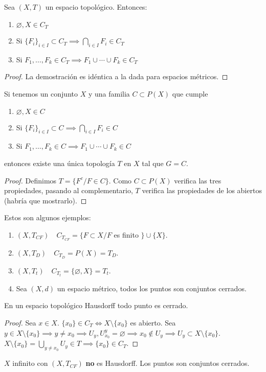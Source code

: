 \begin{properties}
  Sea $(X,T)$ un espacio topológico. Entonces:
  \begin{enumerate}
    \item $\varnothing ,X \in C_T$
    \item Si $\{F_i\}_{i \in I} \subset C_T \implies \bigcap_{i \in I} F_i \in C_T$
    \item Si $F_1,\ldots,F_k \in C_T \implies F_1 \cup \cdots \cup F_k \in C_T$
  \end{enumerate}
\end{properties}
\begin{proof}
  La demostración es idéntica a la dada para espacios métricos.
\end{proof}
\begin{note}
  Si tenemos un conjunto $X$ y una familia $C \subset P(X)$ que cumple
  \begin{enumerate}
    \item $\varnothing ,X \in C$
    \item Si $\{F_i\}_{i \in I} \subset C \implies \bigcap_{i \in I} F_i \in C$
    \item Si $F_1,\ldots,F_k \in C \implies F_1 \cup \cdots \cup F_k \in C$
  \end{enumerate}
  entonces existe una única topología $T$ en $X$ tal que $G=C$.
\end{note}
\begin{proof}
  Definimos $T=\{F^c / {F \in C}\}$. Como $C \subset P(X)$ verifica las tres propiedades, pasando al complementario, $T$ verifica las propiedades de los abiertos (habría que mostrarlo).
\end{proof}
\begin{exmp}
  Estos son algunos ejemplos:
  \begin{enumerate}
    \item $(X,T_{CF}) \quad C_{T_{CF}}=\{F \subset X / F$ es finito $\} \cup \{X\}$.
    \item $(X,T_D) \quad C_{T_D}= P(X)=T_D$.
    \item $(X,T_t) \quad C_{T_t}= \{\varnothing ,X\}=T_t$.
    \item Sea $(X,d)$ un espacio métrico, todos los puntos son conjuntos cerrados.
  \end{enumerate}
\end{exmp}

\begin{properties}
  En un espacio topológico Hausdorff todo punto es cerrado.
\end{properties}
\begin{proof}
  Sea $x \in X$. $\{x_0\} \in C_T \Leftrightarrow X \setminus \{x_0\}$ es abierto. Sea $y \in X \setminus \{x_0\} \implies y \neq x_0 \implies U_y,U_{x_0}^y = \varnothing \implies x_0 \not\in U_y \implies U_y \subset X \setminus \{x_0\}$. $X \setminus \{x_0\} = \bigcup_{y \neq x_0} U_y \in T \implies \{x_0\} \in C_T$.
\end{proof}
\begin{exmp}
  $X$ infinito con $(X,T_{CF})$ \textbf{no} es Hausdorff. Los puntos son conjuntos cerrados.
\end{exmp}

